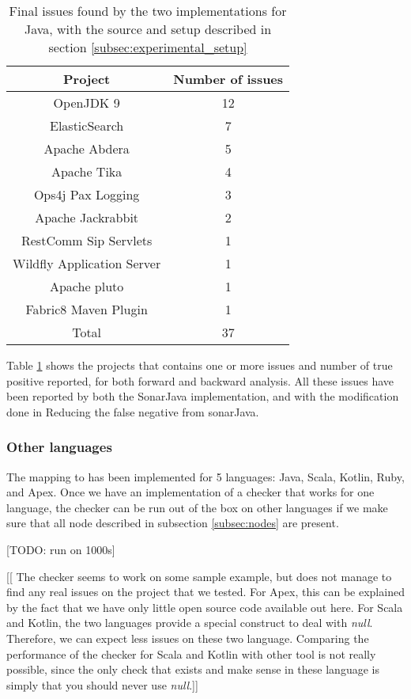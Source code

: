 \begin{table}[h]
	\centering
	\caption{Final issues found by the two implementations for Java, with the source and setup described in section \ref{subsec:experimental_setup}}
	\label{table:issues-per-project}
	\begin{tabular}{|c|c|}
		\hline
		\bf Project & \bf Number of issues\\ \hline
		OpenJDK 9 & 12 \\
		ElasticSearch & 7 \\
		Apache Abdera & 5 \\
		Apache Tika & 	4 \\
		Ops4j Pax Logging & 3 \\
		Apache Jackrabbit & 2 \\
		RestComm Sip Servlets & 1 \\
		Wildfly Application Server & 1 \\
		Apache pluto & 1 \\
		Fabric8 Maven Plugin & 1 \\\hline
		Total &  37 \\ \hline
	\end{tabular}
\end{table}


Table \ref{table:issues-per-project} shows the projects that contains one or more issues and number of true positive reported, for both forward and backward analysis. All these issues have been reported by both the SonarJava implementation, and \slang{} with the modification done in Reducing the false negative from sonarJava.


\subsubsection{Other languages}
\label{subsubsec:other_languages}

The mapping to \slang{} has been implemented for 5 languages: Java, Scala, Kotlin, Ruby, and Apex. Once we have an implementation of a checker that works for one language, the checker can be run out of the box on other languages if we make sure that all node described in subsection \ref{subsec:nodes} are present.

[TODO: run on 1000s] \newline

[[ The checker seems to work on some sample example, but does not manage to find any real issues on the project that we tested. For Apex, this can be explained by the fact that we have only little open source code available out here. For Scala and Kotlin, the two languages provide a special construct to deal with \emph{null}. Therefore, we can expect less issues on these two language. Comparing the performance of the checker for Scala and Kotlin with other tool is not really possible, since the only check that exists and make sense in these language is simply that you should never use \emph{null}.]]

